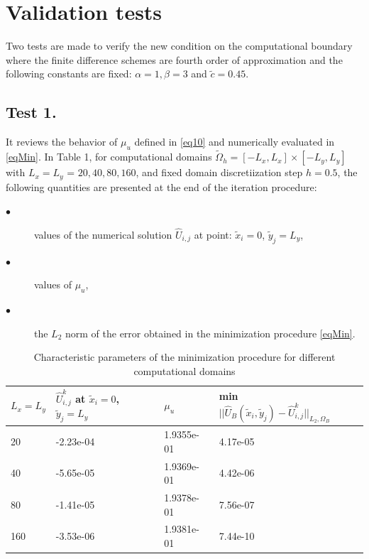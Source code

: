 \documentclass[12pt]{article}
\theoremstyle{theorem}
\theoremstyle{defi}
\begin{document}
\section{Validation tests}

Two tests are made to verify the new condition on the computational boundary where the finite difference schemes are fourth order of approximation and the following constants are fixed:
 $\alpha = 1, \beta = 3$  and  $ \tilde c = 0.45$.

\subsection{Test 1.}

It reviews the behavior of $\mu_u$  defined in  \eqref{eq10} and numerically evaluated in \eqref{eqMin}. In Table 1, for computational domains  $\tilde \Omega_h = [-L_{ x}, L_{ x}] \times  [-L_{ y}, L_{ y}]$
with $ L_{ x} = L_{ y}$ = $20, 40, 80, 160$, and fixed domain discretiization step $h = 0.5$, the following quantities are presented at the end of the iteration procedure:

\begin{description}
  \item[$\bullet$]values of the numerical solution $\widehat{U}_{i,j}$  at point: $\tilde {x}_i = 0$, $ \tilde {y}_j =   L_{ y}$,
  \item[$\bullet$ ] values of $\mu_u$,
  \item[$\bullet$ ] the $L_2$  norm of the error obtained in the minimization procedure \eqref{eqMin}.
\end{description}


\begin{center}
\begin{table}[ht]
\centering
		\begin{tabular}{||C{1.5cm}||C{2.6cm}|C{1.9cm}|C{4.2cm}||}
			\hline
			\hline
      $ L_{ x} = L_{ y}$        &         $\widehat{U}_{i,j}^k$ at  $\tilde {x}_i = 0$, $ \tilde {y}_j =   L_{ y}$    &    $\mu_u$  &  min \mbox{ $|| \widehat  U_B( \tilde x_i, \tilde y_j) - \widehat U ^k_{i,j} ||_{L_2,\Omega_B}$}\\
   			\hline
			    & -2.23e-04    &  1.9355e-01  &     4.17e-05  \\
               	       & -5.65e-05   &   1.9369e-01    &    4.42e-06 \\
			    & -1.41e-05  &      1.9378e-01      &       7.56e-07  \\
			     & -3.53e-06  &    1.9381e-01        &     7.44e-10 \\
		   \hline
	             \hline
                     \end{tabular}
\caption{Characteristic parameters of the minimization procedure for different computational domains}
\label{tab:fourth-der}
\end{table}
\end{center}
\end{document}
